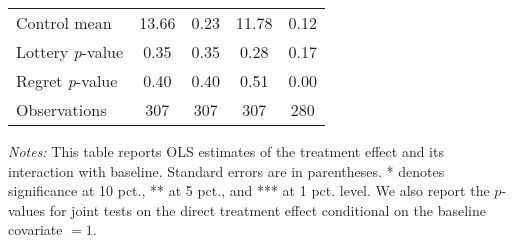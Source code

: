 \begin{table}[htbp]
{\begin{threeparttable}
\begin{tabular}{l*{4}{c}}
Control mean    &    13.66         &     0.23         &    11.78         &     0.12         \\
Lottery \emph{p}-value&     0.35         &     0.35         &     0.28         &     0.17         \\
Regret \emph{p}-value&     0.40         &     0.40         &     0.51         &     0.00         \\
Observations    &      307         &      307         &      307         &      280         \\
\bottomrule \end{tabular} \begin{tablenotes}[flushleft] \footnotesize \item \emph{Notes:} This table reports OLS estimates of the treatment effect and its interaction with baseline. Standard errors are in parentheses. * denotes significance at 10 pct., ** at 5 pct., and *** at 1 pct. level. We also report the \(p\)-values for joint tests on the direct treatment effect conditional on the baseline covariate $= 1$. \end{tablenotes} \end{threeparttable} } \end{table}

